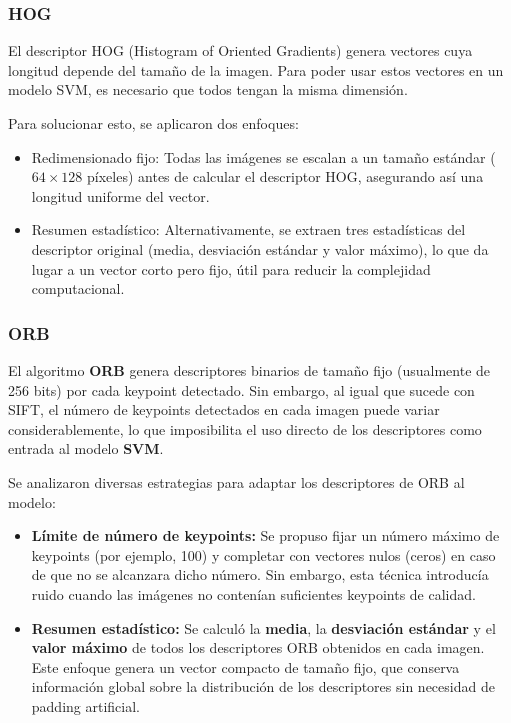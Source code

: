 \documentclass[a4paper]{article}
\begin{document}
\subsubsection*{HOG}

El descriptor HOG (Histogram of Oriented Gradients) genera vectores cuya longitud depende del tamaño de la imagen. 
Para poder usar estos vectores en un modelo SVM, es necesario que todos tengan la misma dimensión.

Para solucionar esto, se aplicaron dos enfoques:
\begin{itemize}
    \item Redimensionado fijo: Todas las imágenes se escalan a un tamaño estándar (\(64\times128\) píxeles) antes de calcular el descriptor HOG, asegurando así una longitud uniforme del vector.
    \item Resumen estadístico: Alternativamente, se extraen tres estadísticas del descriptor original (media, desviación estándar y valor máximo), lo que da lugar a un vector corto pero fijo, útil para reducir la complejidad computacional.
\end{itemize}


\subsubsection*{ORB}

El algoritmo \textbf{ORB} genera descriptores binarios de tamaño fijo (usualmente de 256 bits) por cada keypoint detectado. Sin embargo, al igual que sucede con SIFT, el número de keypoints detectados en cada imagen puede variar considerablemente, lo que imposibilita el uso directo de los descriptores como entrada al modelo \textbf{SVM}.

\par\vspace{0.5cm}
Se analizaron diversas estrategias para adaptar los descriptores de ORB al modelo:

\begin{itemize}
    \item \textbf{Límite de número de keypoints:} Se propuso fijar un número máximo de keypoints (por ejemplo, 100) y completar con vectores nulos (ceros) en caso de que no se alcanzara dicho número. Sin embargo, esta técnica introducía ruido cuando las imágenes no contenían suficientes keypoints de calidad.
    \item \textbf{Resumen estadístico:} Se calculó la \textbf{media}, la \textbf{desviación estándar} y el \textbf{valor máximo} de todos los descriptores ORB obtenidos en cada imagen. Este enfoque genera un vector compacto de tamaño fijo, que conserva información global sobre la distribución de los descriptores sin necesidad de padding artificial.
\end{itemize}
\end{document}
